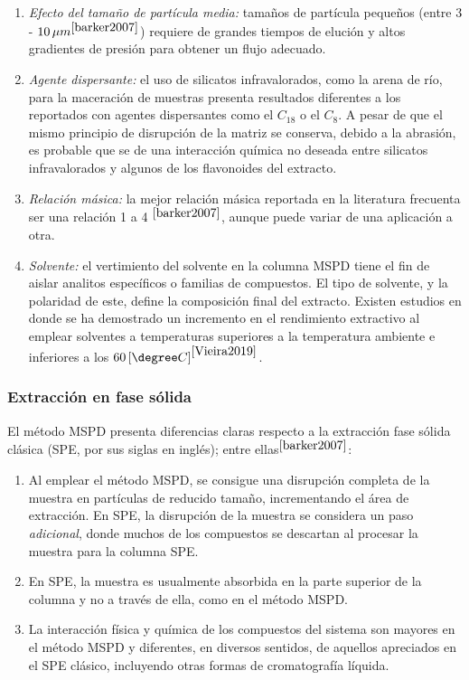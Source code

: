 \begin{enumerate}
	\item \textit{Efecto del tama\~no de part\'icula media:} tama\~nos de part\'icula peque\~nos (entre $3$ - $10 \, \mu m ^{\cite{barker2007}}$) requiere de grandes tiempos de eluci\'on y altos gradientes de presi\'on para obtener un flujo adecuado. 
	\item \textit{Agente dispersante:} el uso de silicatos infravalorados, como la arena de r\'io, para la maceraci\'on de muestras presenta resultados diferentes a los reportados con agentes dispersantes como el $C_{18}$ o el $C_8$. A pesar de que el mismo principio de disrupci\'on de la matriz se conserva, debido a la abrasi\'on, es probable que se de una interacci\'on qu\'imica no deseada entre silicatos infravalorados y algunos de los flavonoides del extracto.
	\item \textit{Relaci\'on m\'asica:} la mejor relaci\'on m\'asica reportada en la literatura frecuenta ser una relaci\'on 1 a 4 $^{\cite{barker2007}}$, aunque puede variar de una aplicaci\'on a otra. 
	\item \textit{Solvente:} el vertimiento del solvente en la columna MSPD tiene el fin de aislar analitos espec\'ificos o familias de compuestos. El tipo de solvente, y la polaridad de este, define la composici\'on final del extracto. Existen estudios en donde se ha demostrado un incremento en el rendimiento extractivo al emplear solventes a temperaturas superiores a la temperatura ambiente e inferiores a los $60 \left[ \degree C \right]^{\cite{Vieira2019}}$. 
\end{enumerate}

\subsubsection{Extracci\'on en fase s\'olida}

\noindent
\justify

El m\'etodo MSPD presenta diferencias claras respecto a la extracci\'on fase s\'olida cl\'asica (SPE, por sus siglas en ingl\'es); entre ellas$^{\cite{barker2007}}$:
\begin{enumerate}
	\item Al emplear el m\'etodo MSPD, se consigue una disrupci\'on completa de la muestra en part\'iculas de reducido tama\~no, incrementando el \'area de extracci\'on. En SPE, la disrupci\'on de la muestra se considera un paso \textit{adicional}, donde muchos de los compuestos se descartan al procesar la muestra para la columna SPE. 
	\item En SPE, la muestra es usualmente absorbida en la parte superior de la columna y no a trav\'es de ella, como en el m\'etodo MSPD.
	\item La interacci\'on f\'isica y qu\'imica de los compuestos del sistema son mayores en el m\'etodo MSPD y diferentes, en diversos sentidos, de aquellos apreciados en el SPE cl\'asico, incluyendo otras formas de cromatograf\'ia l\'iquida.
\end{enumerate}